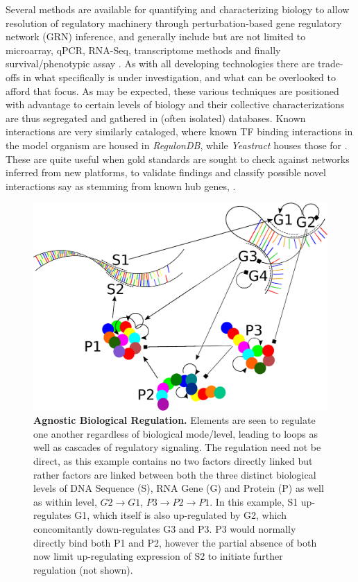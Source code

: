 Several methods are available for quantifying and characterizing biology to allow resolution of regulatory machinery through perturbation-based gene regulatory network (GRN) inference, and generally include but are not limited to microarray, qPCR, RNA-Seq, transcriptome methods and finally survival/phenotypic assay \citep{ideker1999discovery,bansal2007infer,castelo2009reverse,cosgrove2008predicting}. As with all developing technologies there are trade-offs in what specifically is under investigation, and what can be overlooked to afford that focus. As may be expected, these various techniques are positioned with advantage to certain levels of biology and their collective characterizations are thus segregated and gathered in (often isolated) databases. Known interactions are very similarly cataloged, where known TF binding interactions in the model organism \coli are housed in \emph{RegulonDB}\citep{gama2008regulondb}, while \emph{Yeastract}\citep{teixeira2006yeastract} houses those for \yeast. These are quite useful when gold standards are sought to check against networks inferred from new platforms, to validate findings and classify possible novel interactions \eg say as stemming from known hub genes, \etc.

\begin{figure}%
\centering
\includegraphics[width=1\linewidth]{2/DNA2.eps}
\caption{\textbf{Agnostic Biological Regulation.} Elements are seen to regulate one another regardless of biological mode/level, leading to loops as well as cascades of regulatory signaling. The regulation need not be direct, as this example contains no two factors directly linked but rather factors are linked between both the three distinct biological levels of DNA Sequence (S), RNA Gene (G) and Protein (P) as well as within level, \ie $G2\to G1$, $P3\to P2\to P1$. In this example, S1 up-regulates G1, which itself is also up-regulated by G2, which concomitantly down-regulates G3 and P3. P3 would normally directly bind both P1 and P2, however the partial absence of both now limit up-regulating expression of S2 to initiate further regulation (not shown).
}
\label{fig:DNA}
\end{figure}


